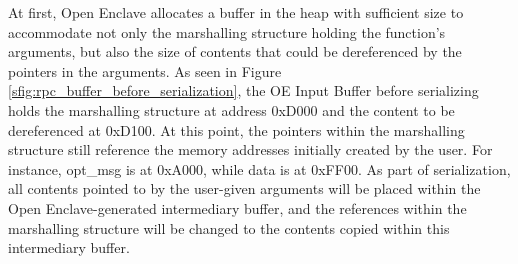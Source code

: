 \documentclass[article, doublespace,nopageskip]{VTthesis} %
\begin{document}

    At first, Open Enclave allocates a buffer in the heap with sufficient size to accommodate not only the marshalling structure holding the function's arguments, but also the size of contents that could be dereferenced by the pointers in the arguments. As seen in Figure \ref{sfig:rpc_buffer_before_serialization}, the OE Input Buffer before serializing holds the marshalling structure at address 0xD000 and the content to be dereferenced at 0xD100. At this point, the pointers within the marshalling structure still reference the memory addresses initially created by the user. For instance, opt\_msg is at 0xA000, while data is at 0xFF00. As part of serialization, all contents pointed to by the user-given arguments will be placed within the Open Enclave-generated intermediary buffer, and the references within the marshalling structure will be changed to the contents copied within this intermediary buffer. 
    
\end{document}
